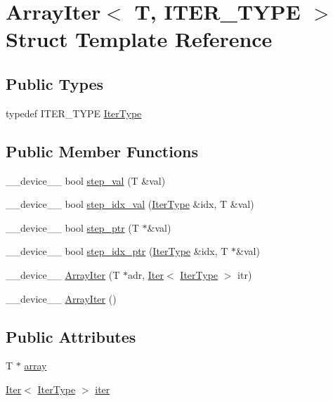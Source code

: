 \hypertarget{structArrayIter}{\section{Array\-Iter$<$ T, I\-T\-E\-R\-\_\-\-T\-Y\-P\-E $>$ Struct Template Reference}
\label{structArrayIter}
}
\subsection*{Public Types}
\begin{DoxyCompactItemize}
\item 
typedef I\-T\-E\-R\-\_\-\-T\-Y\-P\-E \hyperlink{structArrayIter_a337c187c213f6e9136da092047b4b552}{Iter\-Type}
\end{DoxyCompactItemize}
\subsection*{Public Member Functions}
\begin{DoxyCompactItemize}
\item 
\-\_\-\-\_\-device\-\_\-\-\_\- bool \hyperlink{structArrayIter_a7bdb229facaa252e0d3ca2bcf921cb59}{step\-\_\-val} (T \&val)
\item 
\-\_\-\-\_\-device\-\_\-\-\_\- bool \hyperlink{structArrayIter_a064a42121349921f9dda6eb4ccfe0b4b}{step\-\_\-idx\-\_\-val} (\hyperlink{structArrayIter_a337c187c213f6e9136da092047b4b552}{Iter\-Type} \&idx, T \&val)
\item 
\-\_\-\-\_\-device\-\_\-\-\_\- bool \hyperlink{structArrayIter_aa84532c623289a5b8b973df21e1b871f}{step\-\_\-ptr} (T $\ast$\&val)
\item 
\-\_\-\-\_\-device\-\_\-\-\_\- bool \hyperlink{structArrayIter_a20c4e4996b4b465e625483afd84eea1c}{step\-\_\-idx\-\_\-ptr} (\hyperlink{structArrayIter_a337c187c213f6e9136da092047b4b552}{Iter\-Type} \&idx, T $\ast$\&val)
\item 
\-\_\-\-\_\-device\-\_\-\-\_\- \hyperlink{structArrayIter_a41215d29e469b497b9a011e434c06ebd}{Array\-Iter} (T $\ast$adr, \hyperlink{structIter}{Iter}$<$ \hyperlink{structArrayIter_a337c187c213f6e9136da092047b4b552}{Iter\-Type} $>$ itr)
\item 
\-\_\-\-\_\-device\-\_\-\-\_\- \hyperlink{structArrayIter_a0b89902bbdc08804a61e1f747d67ab34}{Array\-Iter} ()
\end{DoxyCompactItemize}
\subsection*{Public Attributes}
\begin{DoxyCompactItemize}
\item 
T $\ast$ \hyperlink{structArrayIter_a287ddbc6e40a39b15db8fed5a7018a3e}{array}
\item 
\hyperlink{structIter}{Iter}$<$ \hyperlink{structArrayIter_a337c187c213f6e9136da092047b4b552}{Iter\-Type} $>$ \hyperlink{structArrayIter_a3892a619a664837d9594765169b3f7c9}{iter}
\end{DoxyCompactItemize}


